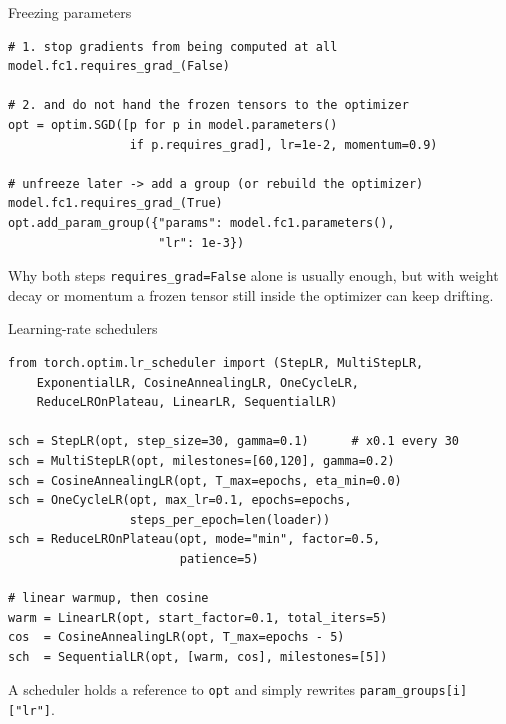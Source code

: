 \documentclass[10pt,aspectratio=169]{beamer}
\begin{document}
\begin{frame}[fragile]{Freezing parameters}
\begin{lstlisting}
# 1. stop gradients from being computed at all
model.fc1.requires_grad_(False)

# 2. and do not hand the frozen tensors to the optimizer
opt = optim.SGD([p for p in model.parameters()
                 if p.requires_grad], lr=1e-2, momentum=0.9)

# unfreeze later -> add a group (or rebuild the optimizer)
model.fc1.requires_grad_(True)
opt.add_param_group({"params": model.fc1.parameters(),
                     "lr": 1e-3})
\end{lstlisting}
\begin{block}{Why both steps}
\texttt{requires\_grad=False} alone is usually enough, but with weight decay or momentum a frozen
tensor still inside the optimizer can keep drifting.
\end{block}
\end{frame}

\begin{frame}[fragile]{Learning-rate schedulers}
\begin{lstlisting}
from torch.optim.lr_scheduler import (StepLR, MultiStepLR,
    ExponentialLR, CosineAnnealingLR, OneCycleLR,
    ReduceLROnPlateau, LinearLR, SequentialLR)

sch = StepLR(opt, step_size=30, gamma=0.1)      # x0.1 every 30
sch = MultiStepLR(opt, milestones=[60,120], gamma=0.2)
sch = CosineAnnealingLR(opt, T_max=epochs, eta_min=0.0)
sch = OneCycleLR(opt, max_lr=0.1, epochs=epochs,
                 steps_per_epoch=len(loader))
sch = ReduceLROnPlateau(opt, mode="min", factor=0.5,
                        patience=5)

# linear warmup, then cosine
warm = LinearLR(opt, start_factor=0.1, total_iters=5)
cos  = CosineAnnealingLR(opt, T_max=epochs - 5)
sch  = SequentialLR(opt, [warm, cos], milestones=[5])
\end{lstlisting}
A scheduler holds a reference to \texttt{opt} and simply rewrites
\texttt{param\_groups[i]["lr"]}.
\end{frame}
\end{document}
